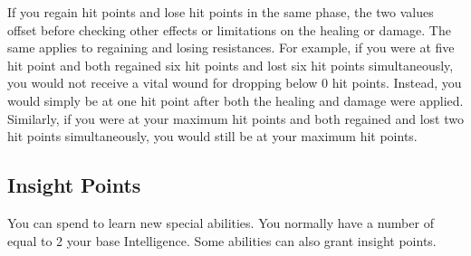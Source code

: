              If you regain hit points and lose hit points in the same phase, the two values offset before checking other effects or limitations on the healing or damage.
            The same applies to regaining and losing resistances.
            For example, if you were at five hit point and both regained six hit points and lost six hit points simultaneously, you would not receive a vital wound for dropping below 0 hit points.
            Instead, you would simply be at one hit point after both the healing and damage were applied.
            Similarly, if you were at your maximum hit points and both regained and lost two hit points simultaneously, you would still be at your maximum hit points.

    \subsection{Insight Points}\label{Insight Points}
        You can spend  to learn new special abilities.
        You normally have a number of  equal to 2 \add your base Intelligence.
        Some abilities can also grant insight points.

